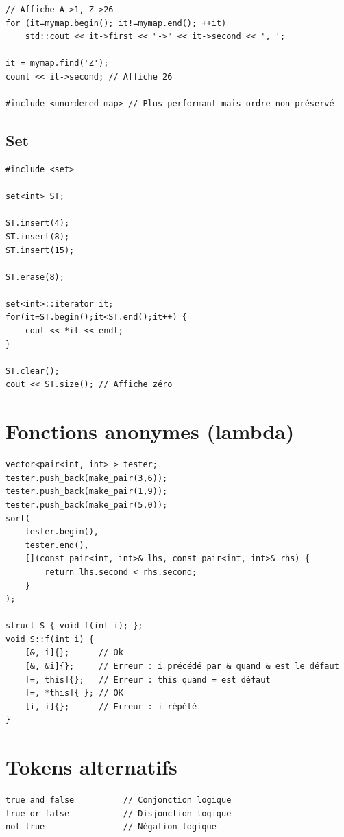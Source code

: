 \documentclass{article}
\begin{document}
\begin{multicols*}{3}
\begin{lstlisting}
// Affiche A->1, Z->26
for (it=mymap.begin(); it!=mymap.end(); ++it)
    std::cout << it->first << "->" << it->second << ', ';

it = mymap.find('Z');
count << it->second; // Affiche 26

#include <unordered_map> // Plus performant mais ordre non préservé

\end{lstlisting}

\subsection*{Set}

\begin{lstlisting}
#include <set>

set<int> ST;

ST.insert(4);
ST.insert(8);
ST.insert(15);

ST.erase(8);

set<int>::iterator it;
for(it=ST.begin();it<ST.end();it++) {
    cout << *it << endl;
}

ST.clear();
cout << ST.size(); // Affiche zéro

\end{lstlisting}

\section*{Fonctions anonymes (lambda)}

\begin{lstlisting}
vector<pair<int, int> > tester;
tester.push_back(make_pair(3,6));
tester.push_back(make_pair(1,9));
tester.push_back(make_pair(5,0));
sort(
    tester.begin(),
    tester.end(),
    [](const pair<int, int>& lhs, const pair<int, int>& rhs) {
        return lhs.second < rhs.second;
    }
);

struct S { void f(int i); };
void S::f(int i) {
    [&, i]{};      // Ok
    [&, &i]{};     // Erreur : i précédé par & quand & est le défaut
    [=, this]{};   // Erreur : this quand = est défaut
    [=, *this]{ }; // OK
    [i, i]{};      // Erreur : i répété
}
\end{lstlisting}

\section*{Tokens alternatifs}

\begin{lstlisting}
true and false          // Conjonction logique
true or false           // Disjonction logique
not true                // Négation logique


\end{lstlisting}
\end{multicols*}
\end{document}
